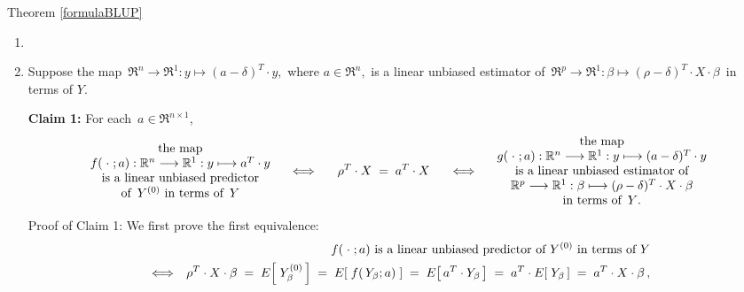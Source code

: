 \proofof Theorem \ref{formulaBLUP}
\begin{enumerate}
\item
\item
	Suppose the map
	\,$\Re^{n} \longrightarrow \Re^{1} : y \longmapsto (a - \delta)^{T}\cdot y$,\,
	where $a \in \Re^{n}$,\, is a linear unbiased estimator of 
	\,$\Re^{p} \longrightarrow \Re^{1} : \beta \longmapsto (\rho - \delta)^{T} \cdot X \cdot \beta$\,
	in terms of $Y$.

	\vskip 0.3cm
	\noindent
	\textbf{Claim 1:}\quad
	For each \,$a \in \Re^{n \times 1}$,
	\begin{equation*}
		\begin{array}{c}
		\textnormal{the map}
		\\
		f(\;\cdot\;;a) : \Re^{n} \longrightarrow \Re^{1} : y \longmapsto a^{T}\cdot y
		\\
		\textnormal{is a linear unbiased predictor}
		\\
		\textnormal{of \,$Y^{(0)}$ in terms of \,$Y$}
		\end{array}
	\quad\Longleftrightarrow\quad\;\;
		\rho^{T} \cdot X \; = \; a^{T} \cdot X
	\;\;\quad\Longleftrightarrow\quad
		\begin{array}{c}
		\textnormal{the map}
		\\
		g(\;\cdot\;;a) : \Re^{n} \longrightarrow \Re^{1} : y \longmapsto (a - \delta)^{T}\cdot y
		\\
		\textnormal{is a linear unbiased estimator of}
		\\
		\Re^{p} \longrightarrow \Re^{1} : \beta \longmapsto (\rho - \delta)^{T} \cdot X \cdot \beta
		\\
		\textnormal{in terms of \,$Y$.}
		\end{array}
	\end{equation*}
	\noindent
	Proof of Claim 1:\quad
	We first prove the first equivalence:
	\begin{eqnarray*}
	&&
		\textnormal{$f(\;\cdot\;;a)$ is a linear unbiased predictor of $Y^{(0)}$ in terms of $Y$}
	\\
	&\Longleftrightarrow&
		\rho^{T} \cdot X \cdot \beta
		\; = \;
			E\!\left[\;Y^{(0)}_{\beta}\,\right]
		\; = \;
			E\!\left[\;f(\,Y_{\beta};a)\;\right]
		\; = \;
			E\!\left[\,a^{T} \cdot Y_{\beta}\,\right]
		\; = \;
			a^{T} \cdot E\!\left[\;Y_{\beta}\,\right]
		\; = \;
			a^{T} \cdot X \cdot \beta\,,

\end{eqnarray*}
\end{enumerate}

